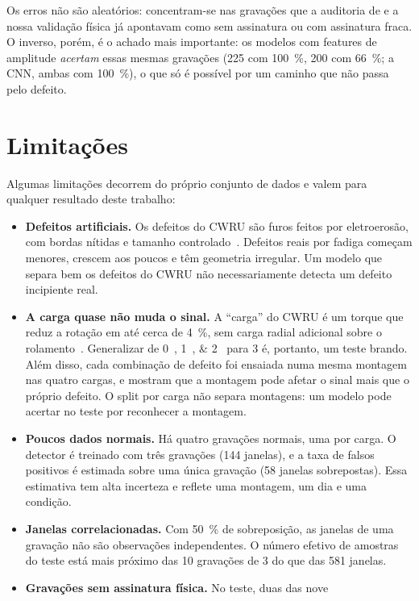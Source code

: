 Os erros não são aleatórios: concentram-se nas gravações que a auditoria de
\textcite{smith2015} e a nossa validação física já apontavam como sem assinatura
ou com assinatura fraca. O inverso, porém, é o achado mais importante: os
modelos com features de amplitude \emph{acertam} essas mesmas gravações (225 com
\SI{100}{\percent}, 200 com \SI{66}{\percent}; a CNN, ambas com
\SI{100}{\percent}), o que só é possível por um caminho que não passa pelo
defeito.

\section{Limitações}
\label{sec:limitacoes}

Algumas limitações decorrem do próprio conjunto de dados e valem para qualquer
resultado deste trabalho:
\begin{itemize}
  \item \textbf{Defeitos artificiais.} Os defeitos do CWRU são furos feitos por
  eletroerosão, com bordas nítidas e tamanho controlado~\cite{cwru}. Defeitos
  reais por fadiga começam menores, crescem aos poucos e têm geometria irregular.
  Um modelo que separa bem os defeitos do CWRU não necessariamente detecta um
  defeito incipiente real.
  \item \textbf{A carga quase não muda o sinal.} A ``carga'' do CWRU é um torque
  que reduz a rotação em até cerca de \SI{4}{\percent}, sem carga radial
  adicional sobre o rolamento~\cite{smith2015}. Generalizar de
  \SIlist{0;1;2}{\hp} para \SI{3}{\hp} é, portanto, um teste brando. Além disso,
  cada combinação de defeito foi ensaiada numa mesma montagem nas quatro cargas, e
  \textcite{smith2015} mostram que a montagem pode afetar o sinal mais que o
  próprio defeito. O split por carga não separa montagens: um modelo pode acertar
  no teste por reconhecer a montagem.
  \item \textbf{Poucos dados normais.} Há quatro gravações normais, uma por carga.
  O detector é treinado com três gravações (144 janelas), e a taxa de falsos
  positivos é estimada sobre uma única gravação (58 janelas sobrepostas). Essa
  estimativa tem alta incerteza e reflete uma montagem, um dia e uma condição.
  \item \textbf{Janelas correlacionadas.} Com \SI{50}{\percent} de sobreposição,
  as janelas de uma gravação não são observações independentes. O número
  efetivo de amostras do teste está mais próximo das 10 gravações de
  \SI{3}{\hp} do que das 581 janelas.
  \item \textbf{Gravações sem assinatura física.} No teste, duas das nove

\end{itemize}
